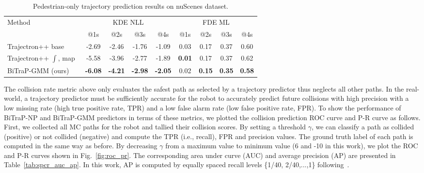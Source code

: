 \documentclass[letterpaper, 10 pt, conference]{ieeeconf}
\begin{document}
\begin{table*}[ht!]
    \centering
    \begin{tabular}{l|cccc|cccc}
        \toprule
        \multirow{2}{*}{Method} & \multicolumn{4}{c|}{KDE NLL} & \multicolumn{4}{c}{FDE ML} \\
        \cmidrule{2-9} 
        & @1s & @2s & @3s & @4s & @1s & @2s & @3s & @4s \\
        \midrule
        Trajectron++ base~\cite{salzmann2020trajectron++} & -2.69 & -2.46 & -1.76 & -1.09 & 0.03 & 0.17 & 0.37 & 0.60 \\
        Trajectron++ $\int$, map~\cite{salzmann2020trajectron++} & -5.58 & -3.96 & -2.77 & -1.89 & \textbf{0.01} & 0.17 & 0.37 & 0.62 \\
        BiTraP-GMM (ours) & \textbf{-6.08} & \textbf{-4.21} & \textbf{-2.98} & \textbf{-2.05} & 0.02 & \textbf{0.15} & \textbf{0.35} & \textbf{0.58} \\
        \bottomrule
    \end{tabular}
    \caption{Pedestrian-only trajectory prediction results on nuScenes dataset.}
    \label{tab:nuscenes_ped}
\end{table*}
 The collision rate metric above only evaluates the safest path as selected by a trajectory predictor thus neglects all other paths. In the real-world, a trajectory predictor must be sufficiently accurate for the robot to accurately predict future collisions with high precision with a low missing rate (high true positive rate, TPR) and a low false alarm rate (low false positive rate, FPR). To show the performance of BiTraP-NP and BiTraP-GMM predictors in terms of these metrics, we plotted the collision prediction ROC curve and P-R curve as follows. First, we collected all MC paths for the robot and tallied their collision scores. By setting a threshold $\gamma$, we can classify a path as collided (positive) or not collided (negative) and compute the TPR (i.e., recall), FPR and precision values. The ground truth label of each path is computed in the same way as before. By decreasing $\gamma$ from a maximum value to minimum value (6 and -10 in this work), we plot the ROC and P-R curves shown in Fig.~\ref{fig:roc_pr}. The corresponding area under curve (AUC) and average precision (AP) are presented in Table~\ref{tab:spcr_auc_ap}. In this work, AP is computed by equally spaced recall levels \{1/40, 2/40,...,1\} following~\cite{simonelli2019monodis}.
\end{document}

